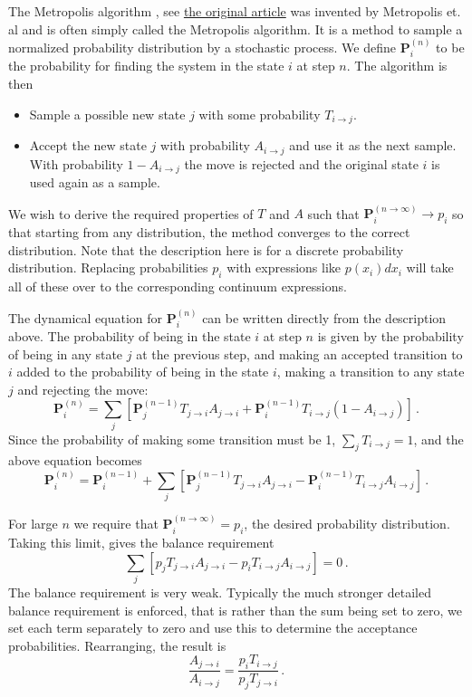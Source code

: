 The Metropolis algorithm , see \href{{http://scitation.aip.org/content/aip/journal/jcp/21/6/10.1063/1.1699114}}{the original article} was invented by Metropolis et. al
and is often simply called the Metropolis algorithm.
It is a method to sample a normalized probability
distribution by a stochastic process. We define $\mathbf{P}_i^{(n)}$ to
be the probability for finding the system in the state $i$ at step $n$.
The algorithm is then

\begin{itemize}
\item Sample a possible new state $j$ with some probability $T_{i\rightarrow j}$.

\item Accept the new state $j$ with probability $A_{i \rightarrow j}$ and use it as the next sample. With probability $1-A_{i\rightarrow j}$ the move is rejected and the original state $i$ is used again as a sample.
\end{itemize}

\noindent
We wish to derive the required properties of $T$ and $A$ such that
$\mathbf{P}_i^{(n\rightarrow \infty)} \rightarrow p_i$ so that starting
from any distribution, the method converges to the correct distribution.
Note that the description here is for a discrete probability distribution.
Replacing probabilities $p_i$ with expressions like $p(x_i)dx_i$ will
take all of these over to the corresponding continuum expressions.

The dynamical equation for $\mathbf{P}_i^{(n)}$ can be written directly from
the description above. The probability of being in the state $i$ at step $n$
is given by the probability of being in any state $j$ at the previous step,
and making an accepted transition to $i$ added to the probability of
being in the state $i$, making a transition to any state $j$ and
rejecting the move:
\[
\mathbf{P}^{(n)}_i = \sum_j \left [
\mathbf{P}^{(n-1)}_jT_{j\rightarrow i} A_{j\rightarrow i} 
+\mathbf{P}^{(n-1)}_iT_{i\rightarrow j}\left ( 1- A_{i\rightarrow j} \right)
\right ] \,.
\]
Since the probability of making some transition must be 1,
$\sum_j T_{i\rightarrow j} = 1$, and the above equation becomes
\[
\mathbf{P}^{(n)}_i = \mathbf{P}^{(n-1)}_i +
 \sum_j \left [
\mathbf{P}^{(n-1)}_jT_{j\rightarrow i} A_{j\rightarrow i} 
-\mathbf{P}^{(n-1)}_iT_{i\rightarrow j}A_{i\rightarrow j}
\right ] \,.
\]

For large $n$ we require that $\mathbf{P}^{(n\rightarrow \infty)}_i = p_i$,
the desired probability distribution. Taking this limit, gives the
balance requirement
\[
 \sum_j \left [
p_jT_{j\rightarrow i} A_{j\rightarrow i}
-p_iT_{i\rightarrow j}A_{i\rightarrow j}
\right ] = 0 \,.
\]
The balance requirement is very weak. Typically the much stronger detailed
balance requirement is enforced, that is rather than the sum being
set to zero, we set each term separately to zero and use this
to determine the acceptance probabilities. Rearranging, the result is
\[
\frac{ A_{j\rightarrow i}}{A_{i\rightarrow j}}
= \frac{p_iT_{i\rightarrow j}}{ p_jT_{j\rightarrow i}} \,.
\]

